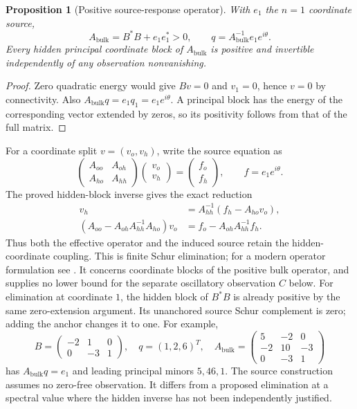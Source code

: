 \documentclass[11pt]{article}
\newtheorem{proposition}[theorem]{Proposition}
\theoremstyle{definition}
\theoremstyle{remark}
\newcommand{\Abulk}{A_{\mathrm{bulk}}}
\begin{document}
\begin{proposition}[Positive source-response operator]
\label{prop:source}
With $e_1$ the $n=1$ coordinate source,
\begin{equation}
 \Abulk=B^*B+e_1e_1^*>0,
 \qquad q=\Abulk^{-1}e_1e^{i\theta}.
 \label{eq:anchored-response}
\end{equation}
Every hidden principal coordinate block of $\Abulk$ is positive and
invertible independently of any observation nonvanishing.
\end{proposition}
\begin{proof}
Zero quadratic energy would give $Bv=0$ and $v_1=0$, hence $v=0$
by connectivity. Also $\Abulk q=e_1q_1=e_1e^{i\theta}$.
A principal block has the energy of the corresponding vector extended
by zeros, so its positivity follows from that of the full matrix.
\end{proof}

For a coordinate split $v=(v_o,v_h)$, write the source equation as
\[
 \begin{pmatrix}A_{oo}&A_{oh}\\A_{ho}&A_{hh}\end{pmatrix}
 \begin{pmatrix}v_o\\v_h\end{pmatrix}
 =\begin{pmatrix}f_o\\f_h\end{pmatrix},\qquad
 f=e_1e^{i\theta}.
\]
The proved hidden-block inverse gives the exact reduction
\begin{align}
 v_h&=A_{hh}^{-1}(f_h-A_{ho}v_o),\nonumber\\
 (A_{oo}-A_{oh}A_{hh}^{-1}A_{ho})v_o
    &=f_o-A_{oh}A_{hh}^{-1}f_h.
 \label{eq:schur-source}
\end{align}
Thus both the effective operator and the induced source retain the
hidden-coordinate coupling. This is finite Schur elimination; for a
modern operator formulation see \cite{feshbach}. It concerns coordinate
blocks of the positive bulk operator, and supplies no lower bound for
the separate oscillatory observation $C$ below.
For elimination at coordinate $1$, the hidden block of
$B^*B$ is already positive by the same zero-extension argument. Its
unanchored source Schur complement is zero; adding the anchor changes
it to one. For example,
\begin{equation}
 B=\begin{pmatrix}-2&1&0\\0&-3&1\end{pmatrix},\quad
 q=(1,2,6)^T,\quad
 \Abulk=\begin{pmatrix}5&-2&0\\-2&10&-3\\0&-3&1\end{pmatrix}
 \label{eq:rational-source}
\end{equation}
has $\Abulk q=e_1$ and leading principal minors $5,46,1$.
The source construction assumes no zero-free observation. It differs
from a proposed elimination at a spectral value where the hidden inverse
has not been independently justified.
\end{document}
